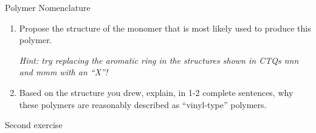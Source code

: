 \begin{activity}{Polymer Nomenclature}
\begin{exercises}
		\begin{enumerate}
		
			\item Propose the structure of the monomer that is most likely used to produce this polymer.
			
				\emph{Hint: try replacing the aromatic ring in the structures shown in CTQs nnn and mmm with an ``X''!}
			
			\item Based on the structure you drew, explain, in 1-2 complete sentences, why these polymers are reasonably described as ``vinyl-type'' polymers.
			
		\end{enumerate}
		
		
	
		
	\exercise Second exercise
	
\end{exercises}

	
\end{activity}